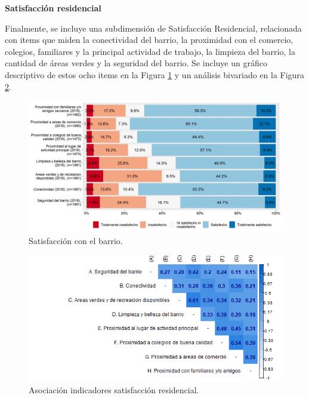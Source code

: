 \documentclass[
  12pt,
]{book}
\begin{document}
\textbf{Satisfacción residencial}

Finalmente, se incluye una subdimensión de Satisfacción Residencial, relacionada con items que miden la conectividad del barrio, la proximidad con el comercio, colegios, familiares y la principal actividad de trabajo, la limpieza del barrio, la cantidad de áreas verdes y la seguridad del barrio. Se incluye un gráfico descriptivo de estos ocho items en la Figura \ref{fig:satisfaccion-residencial} y un análisis bivariado en la Figura \ref{fig:satisfaccion-residencial-cor}.

\begin{figure}[H]

{\centering \includegraphics[width=1\linewidth,height=1\textheight]{output/graphs/satisfaccion-residencial} 

}

\caption{Satisfacción con el barrio.}\label{fig:satisfaccion-residencial}
\end{figure}

\begin{figure}[H]

{\centering \includegraphics[width=1\linewidth,height=1\textheight]{output/graphs/satisfaccion-residencial_cor} 

}

\caption{Asociación indicadores satisfacción residencial.}\label{fig:satisfaccion-residencial-cor}
\end{figure}
\end{document}
